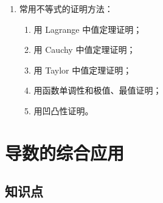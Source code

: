 \documentclass[UTF8]{ctexart}
\theoremstyle{remark}
\begin{document}
\begin{enumerate}
		\item 常用不等式的证明方法：
		\begin{enumerate}
			\item 用 Lagrange 中值定理证明；
			\item 用 Cauchy 中值定理证明；
			\item 用 Taylor 中值定理证明；
			\item 用函数单调性和极值、最值证明；
			\item 用凹凸性证明。
		\end{enumerate}
	\end{enumerate}
	
	
	\section{导数的综合应用}
	
	\subsection*{知识点}
	
\end{document}
